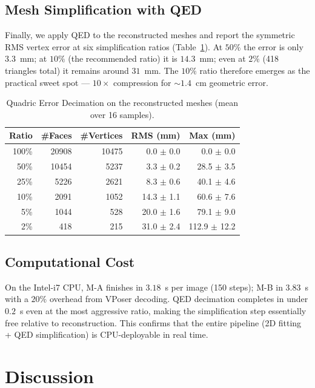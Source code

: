 \documentclass[conference]{IEEEtran}
\begin{document}
\subsection{Mesh Simplification with QED}
Finally, we apply QED \cite{QED} to the reconstructed meshes and report the symmetric RMS vertex error at six simplification ratios (Table~\ref{tab:qed}). At $50\%$ the error is only $3.3$~mm; at $10\%$ (the recommended ratio) it is $14.3$~mm; even at $2\%$ (418 triangles total) it remains around $31$~mm. The $10\%$ ratio therefore emerges as the practical sweet spot --- $10\times$ compression for $\sim\!\!1.4$~cm geometric error.

\begin{table}[htbp]
\centering
\caption{Quadric Error Decimation on the reconstructed meshes (mean over 16 samples).}
\label{tab:qed}
\begin{tabular}{r r r r r}
\toprule
Ratio & \#Faces & \#Vertices & RMS (mm) & Max (mm) \\
\midrule
100\% & 20908 & 10475 & 0.0 $\pm$ 0.0  & 0.0 $\pm$ 0.0 \\
50\%  & 10454 &  5237 & 3.3 $\pm$ 0.2  & 28.5 $\pm$ 3.5 \\
25\%  &  5226 &  2621 & 8.3 $\pm$ 0.6  & 40.1 $\pm$ 4.6 \\
10\%  &  2091 &  1052 & 14.3 $\pm$ 1.1 & 60.6 $\pm$ 7.6 \\
5\%   &  1044 &   528 & 20.0 $\pm$ 1.6 & 79.1 $\pm$ 9.0 \\
2\%   &   418 &   215 & 31.0 $\pm$ 2.4 & 112.9 $\pm$ 12.2 \\
\bottomrule
\end{tabular}
\end{table}

\subsection{Computational Cost}
On the Intel-i7 CPU, \textsc{M-A} finishes in $3.18$~s per image (150 steps); \textsc{M-B} in $3.83$~s with a $20\%$ overhead from VPoser decoding. QED decimation completes in under $0.2$~s even at the most aggressive ratio, making the simplification step essentially free relative to reconstruction. This confirms that the entire pipeline (2D fitting + QED simplification) is CPU-deployable in real time.

\section{Discussion}
\label{sec:discussion}
\end{document}

